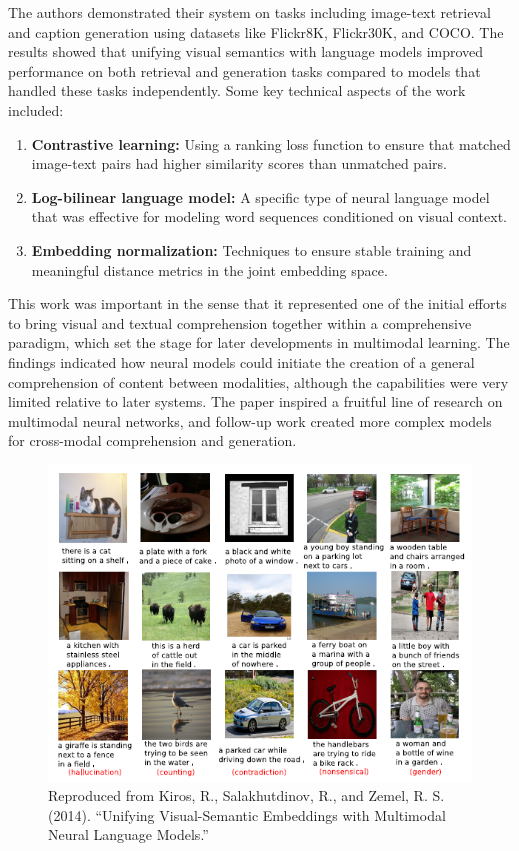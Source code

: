 \documentclass[conference]{IEEEtran}
\begin{document}
\begin{enumerate}
\begin{enumerate}
\end{enumerate}
The authors demonstrated their system on tasks including image-text retrieval and caption generation using datasets like Flickr8K, Flickr30K, and COCO. The results showed that unifying visual semantics with language models improved performance on both retrieval and generation tasks compared to models that handled these tasks independently.
Some key technical aspects of the work included:
\begin{enumerate}
\item \textbf{Contrastive learning:} Using a ranking loss function to ensure that matched image-text pairs had higher similarity scores than unmatched pairs.
\item \textbf{Log-bilinear language model:} A specific type of neural language model that was effective for modeling word sequences conditioned on visual context.
\item \textbf{Embedding normalization:} Techniques to ensure stable training and meaningful distance metrics in the joint embedding space.
\end{enumerate}
This work was important in the sense that it represented one of the initial efforts to bring visual and textual comprehension together within a comprehensive paradigm, which set the stage for later developments in multimodal learning. The findings indicated how neural models could initiate the creation of a general comprehension of content between modalities, although the capabilities were very limited relative to later systems. The paper inspired a fruitful line of research on multimodal neural networks, and follow-up work created more complex models for cross-modal comprehension and generation.

\begin{figure}
    \centering
    \includegraphics[width=0.9\linewidth]{images/image5.png}
    \caption{Reproduced from Kiros, R., Salakhutdinov, R., and Zemel, R. S. (2014). “Unifying Visual-Semantic Embeddings with Multimodal Neural Language Models.”}
    \label{fig:enter-label}
\end{figure}


\end{enumerate}
\end{document}
